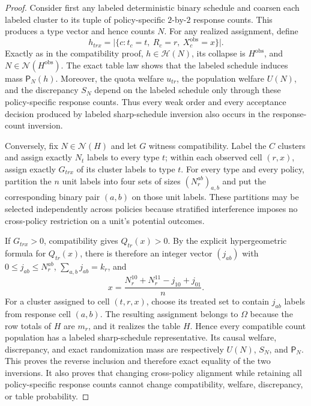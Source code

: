 \documentclass{article}
\begin{document}
\begin{proof}
Consider first any labeled deterministic binary schedule and coarsen each labeled cluster to its tuple of policy-specific \(2\)-by-\(2\) response counts.  This produces a type vector and hence counts \(N\).  For any realized assignment, define
\[
 h_{trx}=\bigl|\{c:t_c=t,\ R_c=r,\ X_c^{\mathrm{obs}}=x\}\bigr|.
\]
Exactly as in the compatibility proof, \(h\in\mathcal H(N)\), its collapse is \(H^{\mathrm{obs}}\), and \(N\in\mathcal N(H^{\mathrm{obs}})\).  The exact table law shows that the labeled schedule induces mass \(\mathsf P_N(h)\).  Moreover, the quota welfare \(u_{tr}\), the population welfare \(U(N)\), and the discrepancy \(S_N\) depend on the labeled schedule only through these policy-specific response counts.  Thus every weak order and every acceptance decision produced by labeled sharp-schedule inversion also occurs in the response-count inversion.

Conversely, fix \(N\in\mathcal N(H)\) and let \(G\) witness compatibility.  Label the \(C\) clusters and assign exactly \(N_t\) labels to every type \(t\); within each observed cell \((r,x)\), assign exactly \(G_{trx}\) of its cluster labels to type \(t\).  For every type and every policy, partition the \(n\) unit labels into four sets of sizes \((N_r^{ab})_{a,b}\) and put the corresponding binary pair \((a,b)\) on those unit labels.  These partitions may be selected independently across policies because stratified interference imposes no cross-policy restriction on a unit's potential outcomes.

If \(G_{trx}>0\), compatibility gives \(Q_{tr}(x)>0\).  By the explicit hypergeometric formula for \(Q_{tr}(x)\), there is therefore an integer vector \((j_{ab})\) with \(0\le j_{ab}\le N_r^{ab}\), \(\sum_{a,b}j_{ab}=k_r\), and
\[
 x=\frac{N_r^{10}+N_r^{11}-j_{10}+j_{01}}{n}.
\]
For a cluster assigned to cell \((t,r,x)\), choose its treated set to contain \(j_{ab}\) labels from response cell \((a,b)\).  The resulting assignment belongs to \(\Omega\) because the row totals of \(H\) are \(m_r\), and it realizes the table \(H\).  Hence every compatible count population has a labeled sharp-schedule representative.  Its causal welfare, discrepancy, and exact randomization mass are respectively \(U(N)\), \(S_N\), and \(\mathsf P_N\).  This proves the reverse inclusion and therefore exact equality of the two inversions.  It also proves that changing cross-policy alignment while retaining all policy-specific response counts cannot change compatibility, welfare, discrepancy, or table probability.


\end{proof}
\end{document}
